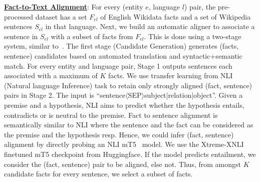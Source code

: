 \documentclass[runningheads]{llncs}
\begin{document}
\noindent\underline{\textbf{Fact-to-Text Alignment}}:
For every (entity $e$, language $l$) pair, the pre-processed dataset has a set $F_{el}$ of English Wikidata facts and a set of Wikipedia sentences $S_{el}$ in that language. Next, we build an automatic aligner to associate a sentence in $S_{el}$ with a subset of facts from $F_{el}$. This is done using a two-stage system, similar to~\cite{abhishek2022xalign}. The first stage (Candidate Generation) generates (facts, sentence) candidates based on automated translation and syntactic+semantic match. For every entity and language pair, Stage 1 outputs sentences each associated with a maximum of $K$ facts. We use transfer learning from NLI (Natural language Inference) task to retain only strongly aligned (fact, sentence) pairs in Stage 2. The input is ``sentence$\langle$SEP$\rangle$subject|relation|object''. Given a premise and a hypothesis, NLI aims to predict whether the hypothesis entails, contradicts or is neutral to the premise. Fact to sentence alignment is semantically similar to NLI where the sentence and the fact can be considered as the premise and the hypothesis resp. Hence, we could infer (fact, sentence) alignment by directly probing an NLI mT5~\cite{xue2021mt5} model. We use the Xtreme-XNLI finetuned mT5 checkpoint from Huggingface. If the model predicts entailment, we consider the (fact, sentence) pair to be aligned, else not. Thus, from amongst $K$ candidate facts for every sentence, we select a subset of facts. 
\end{document}
